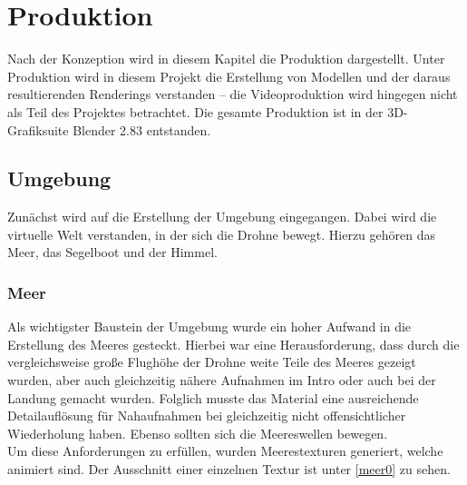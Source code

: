 \chapter{Produktion}
Nach der Konzeption wird in diesem Kapitel die Produktion dargestellt. Unter Produktion wird in diesem Projekt die Erstellung von Modellen und der daraus resultierenden Renderings verstanden -- die Videoproduktion wird hingegen nicht als Teil des Projektes betrachtet. Die gesamte Produktion ist in der 3D-Grafiksuite Blender 2.83 entstanden.

\section{Umgebung}

Zunächst wird auf die Erstellung der Umgebung eingegangen. Dabei wird die virtuelle Welt verstanden, in der sich die Drohne bewegt. Hierzu gehören das Meer, das Segelboot und der Himmel.

\subsection{Meer}

Als wichtigster Baustein der Umgebung wurde ein hoher Aufwand in die Erstellung des Meeres gesteckt. Hierbei war eine Herausforderung, dass durch die vergleichsweise große Flughöhe der Drohne weite Teile des Meeres gezeigt wurden, aber auch gleichzeitig nähere Aufnahmen im Intro oder auch bei der Landung gemacht wurden. Folglich musste das Material eine ausreichende Detailauflösung für Nahaufnahmen bei gleichzeitig nicht offensichtlicher Wiederholung haben. Ebenso sollten sich die Meereswellen bewegen.\\
Um diese Anforderungen zu erfüllen, wurden Meerestexturen generiert, welche animiert sind. Der Ausschnitt einer einzelnen Textur ist unter \autoref{meer0} zu sehen. 

